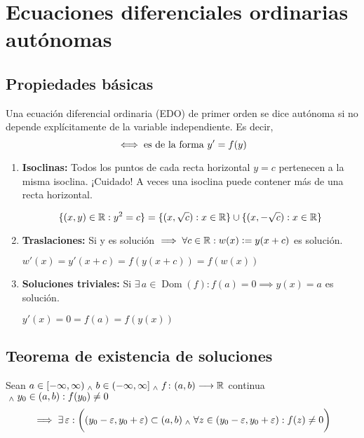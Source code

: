 \section{Ecuaciones diferenciales ordinarias autónomas}

\subsection{Propiedades básicas}

\begin{defn}
	Una ecuación diferencial ordinaria (EDO) de primer orden se dice autónoma si no depende explícitamente de la variable independiente. Es decir,
	\[\iff \text{es de la forma } y'=f(y)\]
\end{defn}

\begin{enumerate}
	\item \textbf{Isoclinas:} Todos los puntos de cada recta horizontal $y=c$ pertenecen a la misma isoclina. ¡Cuidado! A veces una isoclina puede contener más de una recta horizontal.
	      \begin{ejem}[$y'=y^2$]
		      \[\{(x,y)\in \mathbb{R}:y^2=c\}=\{(x,\sqrt{c}):x\in\mathbb{R}\}\cup\{(x,-\sqrt{c}):x\in\mathbb{R}\}\]
	      \end{ejem}
	\item \textbf{Traslaciones:} Si y es solución $\implies \forall c \in \mathbb{R} : w(x)\vcentcolon= y(x+c)$ es solución.
	      \begin{dem}
		      $w'(x)=y'(x+c)=f(y(x+c))=f(w(x))$
	      \end{dem}
	\item \textbf{Soluciones triviales:} Si $\exists \, a \in \operatorname{Dom}(f) : f(a)=0 \implies y(x)=a$ es solución.
	      \begin{dem}
		      $y'(x)=0=f(a)=f(y(x))$
	      \end{dem}
\end{enumerate}

\subsection{Teorema de existencia de soluciones}
Sean $a\in [-\infty, \infty) \; _{\wedge} \; b\in (-\infty, \infty] \; _{\wedge} \; f \colon (a,b) \longrightarrow \mathbb{R}$ continua$ \; _{\wedge} \; y_0 \in (a,b) : f(y_0) \ne 0$
\[\implies \exists \, \varepsilon : \bigg((y_0-\varepsilon, y_0+\varepsilon) \subset (a,b) \; _{\wedge} \; \forall z \in (y_0-\varepsilon, y_0+\varepsilon) : f(z)\ne 0\bigg)\]

